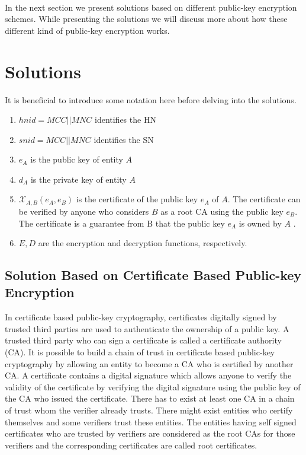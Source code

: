 \documentclass[lnicst,sechang,a4paper]{svmultln}
\begin{document}
\paragraph{}
In the next section we present solutions based on different public-key encryption schemes. While presenting the solutions we will discuss more about how these different kind of public-key encryption works.

\section{Solutions}\label{sec:solutions} 
\label{sec:solutions}
It is beneficial to introduce some notation here before delving into the solutions. 
\begin{enumerate}
\item $hnid=MCC||MNC$ identifies the HN
\item $snid=MCC||MNC$ identifies the SN
\item $e_A$ is the public key of entity $A$
\item $d_A$ is the private key of entity $A$ 
\item $\mathcal{X}_{A,B}(e_A,e_B)$ is the certificate of the public key $e_A$ of $A$. The certificate can be verified by anyone who considers $B$ as a root CA using the public key $e_B$. The certificate is a guarantee from B that the public key $e_A$ is owned by $A$ .
\item $E,D$ are the encryption and decryption functions, respectively.
\end{enumerate}


\subsection{Solution Based on Certificate Based Public-key Encryption} 
\label{sub_sec:solution_certificate}
In certificate based public-key cryptography, certificates digitally signed by trusted third parties are used to authenticate the ownership of a public key. A trusted third party who can sign a certificate is called a certificate authority (CA). It is possible to build a chain of trust in certificate based public-key cryptography by allowing an entity to become a CA who is certified by another CA. A certificate contains a digital signature which allows anyone to verify the validity of the certificate by verifying the digital signature using the public key of the CA who issued the certificate. There has to exist at least one CA in a chain of trust whom the verifier already trusts. There might exist entities who certify themselves and some verifiers trust these entities. The entities having self signed certificates who are trusted by verifiers are considered as the root CAs for those verifiers and the corresponding certificates are called root certificates. 
\end{document}
